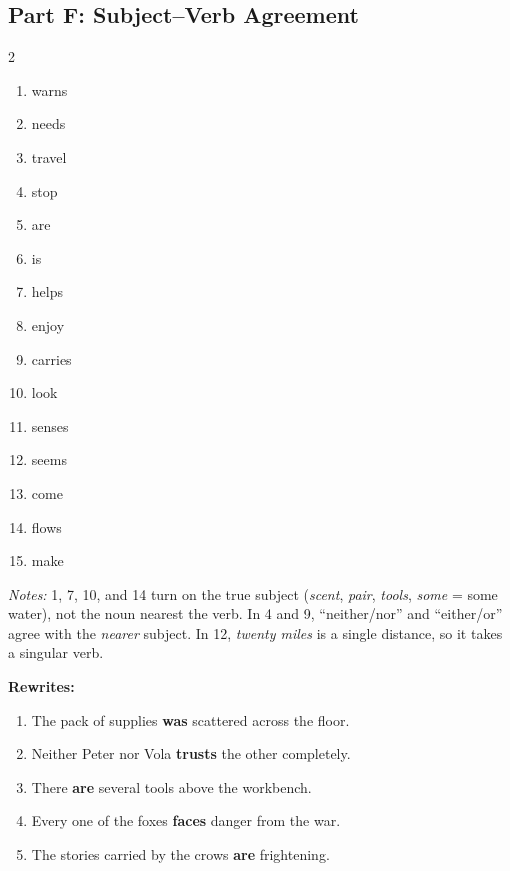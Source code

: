 \documentclass[11pt]{article}
\begin{document}
\subsection*{Part F: Subject--Verb Agreement}
\begin{multicols}{2}
\begin{enumerate}
  \item warns
  \item needs
  \item travel
  \item stop
  \item are
  \item is
  \item helps
  \item enjoy
  \item carries
  \item look
  \item senses
  \item seems
  \item come
  \item flows
  \item make
\end{enumerate}
\end{multicols}

\textit{Notes:} 1, 7, 10, and 14 turn on the true subject (\emph{scent}, \emph{pair}, \emph{tools}, \emph{some} = some water), not the noun nearest the verb. In 4 and 9, ``neither/nor'' and ``either/or'' agree with the \emph{nearer} subject. In 12, \emph{twenty miles} is a single distance, so it takes a singular verb.

\textbf{Rewrites:}
\begin{enumerate}[start=16]
  \item The pack of supplies \textbf{was} scattered across the floor.
  \item Neither Peter nor Vola \textbf{trusts} the other completely.
  \item There \textbf{are} several tools above the workbench.
  \item Every one of the foxes \textbf{faces} danger from the war.
  \item The stories carried by the crows \textbf{are} frightening.
\end{enumerate}
\end{document}
